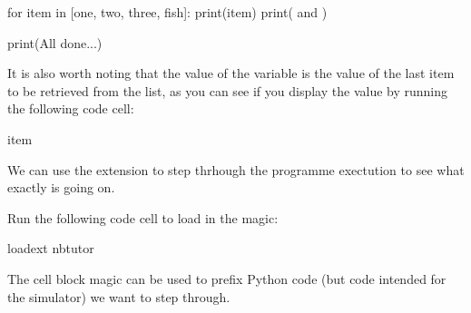 \documentclass[letterpaper,10pt,english]{sphinxmanual}
\begin{document}
{{
\begin{sphinxVerbatim}[commandchars=\\\{\}]
\llap{\color{nbsphinxin}[ ]:\,\hspace{\fboxrule}\hspace{\fboxsep}}for item in [\PYGZsq{}one\PYGZsq{}, \PYGZsq{}two\PYGZsq{}, \PYGZsq{}three\PYGZsq{}, \PYGZsq{}fish\PYGZsq{}]:
    print(item)
    print(\PYGZsq{} and \PYGZsq{})

print(\PYGZsq{}All done...\PYGZsq{})
\end{sphinxVerbatim}
}

It is also worth noting that the value of the  variable is the value of the last item to be retrieved from the list, as you can see if you display the value by running the following code cell:

{
\begin{sphinxVerbatim}[commandchars=\\\{\}]
\llap{\color{nbsphinxin}[ ]:\,\hspace{\fboxrule}\hspace{\fboxsep}}item
\end{sphinxVerbatim}
}

We can use the  extension to step thrhough the programme exectution to see what exactly is going on.

Run the following code cell to load in the  magic:

{
\begin{sphinxVerbatim}[commandchars=\\\{\}]
\llap{\color{nbsphinxin}[ ]:\,\hspace{\fboxrule}\hspace{\fboxsep}}\PYGZpc{}load\PYGZus{}ext nbtutor
\end{sphinxVerbatim}
}

The  cell block magic can be used to prefix Python code (but  code intended for the simulator) we want to step through.


}
\end{document}
